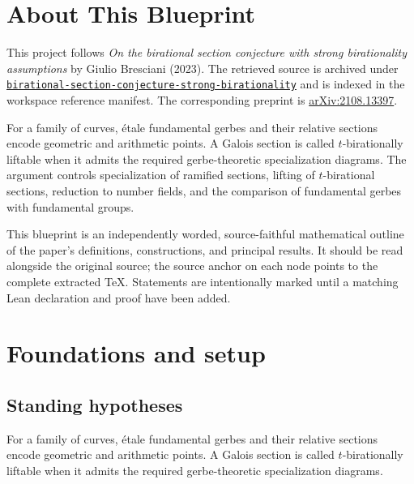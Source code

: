 

\chapter*{About This Blueprint}
\label{birational-section-conjecture-strong-birationality-about}

This project follows \emph{On the birational section conjecture with strong birationality assumptions} by Giulio Bresciani (2023). The
retrieved source is archived under
\href{../../../../../references/birational-section-conjecture-strong-birationality/}{\texttt{birational-section-conjecture-strong-birationality}} and is indexed in
the workspace reference manifest. The corresponding preprint is
\href{https://arxiv.org/abs/2108.13397}{arXiv:2108.13397}.

For a family of curves, étale fundamental gerbes and their relative sections encode geometric and arithmetic points. A Galois section is called $t$-birationally liftable when it admits the required gerbe-theoretic specialization diagrams. The argument controls specialization of ramified sections, lifting of $t$-birational sections, reduction to number fields, and the comparison of fundamental gerbes with fundamental groups.

This blueprint is an independently worded, source-faithful mathematical
outline of the paper's definitions, constructions, and principal results. It
should be read alongside the original source; the source anchor on each node
points to the complete extracted TeX. Statements are intentionally marked
\notready until a matching Lean declaration and proof have been added.

\chapter{Foundations and setup}
\label{chap:birational-section-conjecture-strong-birationality-foundations}

\section{Standing hypotheses}
\label{sec:birational-section-conjecture-strong-birationality-standing}

For a family of curves, étale fundamental gerbes and their relative sections encode geometric and arithmetic points. A Galois section is called $t$-birationally liftable when it admits the required gerbe-theoretic specialization diagrams.

